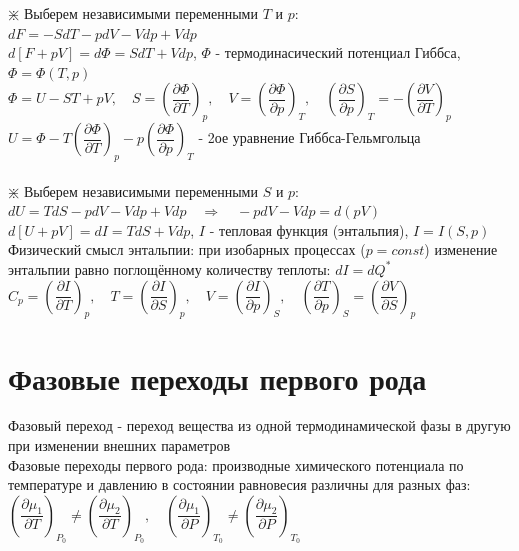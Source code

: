 \begin{multicols*}{2}
		$\divideontimes$ Выберем независимыми переменными $T$ и $p$:\\
		$dF = -SdT - pdV - Vdp + Vdp$\\
		$d\left[F + pV\right] = d\Phi = S dT + V dp$, \quad $\Phi$ - термодинасический потенциал Гиббса, \quad $\Phi = \Phi(T, p)$\\
		$\Phi = U-ST+pV, \quad S = \left(\dfrac{\partial \Phi}{\partial T}\right)_p, \quad V = \left(\dfrac{\partial \Phi}{\partial p}\right)_T, \quad \left(\dfrac{\partial S}{\partial p}\right)_T = - \left(\dfrac{\partial V}{\partial T}\right)_p$\\
		$U = \Phi - T \left(\dfrac{\partial \Phi}{\partial T}\right)_p - p \left(\dfrac{\partial \Phi}{\partial p}\right)_T$ - 2ое уравнение Гиббса-Гельмгольца\\\\

		$\divideontimes$ Выберем независимыми переменными $S$ и $p$:\\
		$dU = TdS - pdV - Vdp + Vdp \quad \Rightarrow \quad - pdV - Vdp = d(pV)$\\
		$d\left[U + pV\right] = dI = T dS + V dp$, \quad $I$ - тепловая функция (энтальпия), \quad $I = I(S, p)$\\
		Физический смысл энтальпии: при изобарных процессах ($p = const$) изменение энтальпии равно поглощённому количеству теплоты: $dI = dQ^*$\\
		$C_p = \left(\dfrac{\partial I}{\partial T}\right)_p, \quad T = \left(\dfrac{\partial I}{\partial S}\right)_p, \quad V = \left(\dfrac{\partial I}{\partial p}\right)_S, \quad \left(\dfrac{\partial T}{\partial p}\right)_S = \left(\dfrac{\partial V}{\partial S}\right)_p$\\
 
		\section{Фазовые переходы первого рода}
		Фазовый переход - переход вещества из одной термодинамической фазы в другую при изменении внешних параметров\\
		Фазовые переходы первого рода: производные химического потенциала по температуре и давлению в состоянии равновесия различны для разных фаз:\\
		$\left(\dfrac{\partial \mu_1}{\partial T}\right)_{P_0} \neq \left(\dfrac{\partial \mu_2}{\partial T}\right)_{P_0}, \quad \left(\dfrac{\partial \mu_1}{\partial P}\right)_{T_0} \neq \left(\dfrac{\partial \mu_2}{\partial P}\right)_{T_0}$\\


\end{multicols*}
